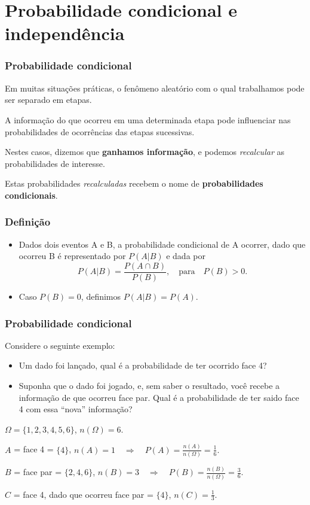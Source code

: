 \documentclass[11pt]{beamer}
\begin{document}
\section{Probabilidade condicional e independência}
\begin{frame}
\frametitle{Probabilidade condicional}

Em muitas situações práticas, o fenômeno aleatório com o qual
trabalhamos pode ser separado em etapas.

A informação do que ocorreu em uma determinada etapa pode influenciar
nas probabilidades de ocorrências das etapas sucessivas.

Nestes casos, dizemos que \textbf{ganhamos informação}, e podemos
\emph{recalcular} as probabilidades de interesse.

Estas probabilidades \emph{recalculadas} recebem o nome de
\textbf{probabilidades condicionais}.
\end{frame}

\begin{frame}
\frametitle{Definição}

\begin{itemize}
\item
  Dados dois eventos A e B, a probabilidade condicional de A ocorrer,
  dado que ocorreu B é representado por \(P(A | B)\) e dada por \[
  P(A | B) = \frac{P(A \cap B)}{P(B)}, \quad \text{para} \quad P(B) > 0.
  \]
\item
  Caso \(P(B) = 0\), definimos \(P(A | B) = P(A).\)
\end{itemize}
\end{frame}

\begin{frame}
\frametitle{Probabilidade condicional}

Considere o seguinte exemplo:

\begin{itemize}
\item
  Um dado foi lançado, qual é a probabilidade de ter ocorrido face 4?
\item
  Suponha que o dado foi jogado, e, sem saber o resultado, você recebe a
  informação de que ocorreu face par. Qual é a probabilidade de ter
  saido face 4 com essa ``nova'' informação?
\end{itemize}

\(\Omega = \{1,2,3,4,5,6\}\), \(n(\Omega) = 6.\)

\(A\) = face 4 = \(\{4\}\),
\(n(A) = 1 \quad \Rightarrow \quad P(A) = \frac{n(A)}{n(\Omega)} = \frac{1}{6}.\)

\(B\) = face par = \(\{2,4,6\}\),
\(n(B) = 3 \quad \Rightarrow \quad P(B) = \frac{n(B)}{n(\Omega)} = \frac{3}{6}.\)

\(C\) = face 4, dado que ocorreu face par = \(\{4\}\),
\(n(C) = \frac{1}{3}.\)

\end{frame}
\end{document}
